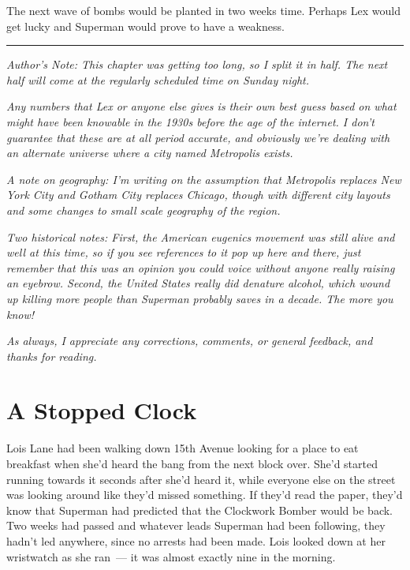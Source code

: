 \documentclass[ebook,12pt]{memoir}
\begin{document}
The next wave of bombs would be planted in two weeks time. Perhaps Lex
would get lucky and Superman would prove to have a weakness.

\begin{center}\rule{0.5\linewidth}{0.5pt}\end{center}

\emph{Author's Note: This chapter was getting too long, so I split it in
half. The next half will come at the regularly scheduled time on Sunday
night.}

\emph{Any numbers that Lex or anyone else gives is their own best guess
based on what might have been knowable in the 1930s before the age of
the internet. I don't guarantee that these are at all period accurate,
and obviously we're dealing with an alternate universe where a city
named Metropolis exists.}

\emph{A note on geography: I'm writing on the assumption that Metropolis
replaces New York City and Gotham City replaces Chicago, though with
different city layouts and some changes to small scale geography of the
region.}

\emph{Two historical notes: First, the American eugenics movement was
still alive and well at this time, so if you see references to it pop up
here and there, just remember that this was an opinion you could voice
without anyone really raising an eyebrow. Second, the United States
really did denature alcohol, which wound up killing more people than
Superman probably saves in a decade. The more you know!}

\emph{As always, I appreciate any corrections, comments, or general
feedback, and thanks for reading.}



\hypertarget{a-stopped-clock}{%
\chapter{A Stopped Clock}\label{a-stopped-clock}}

Lois Lane had been walking down 15th Avenue looking for a place to eat
breakfast when she'd heard the bang from the next block over. She'd
started running towards it seconds after she'd heard it, while everyone
else on the street was looking around like they'd missed something. If
they'd read the paper, they'd know that Superman had predicted that the
Clockwork Bomber would be back. Two weeks had passed and whatever leads
Superman had been following, they hadn't led anywhere, since no arrests
had been made. Lois looked down at her wristwatch as she ran~--- it was
almost exactly nine in the morning.
\end{document}

